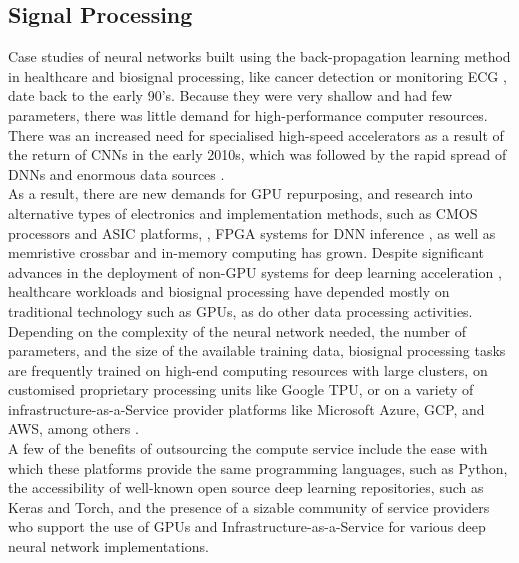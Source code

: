 \subsection[Signal Processing]{Signal Processing}

Case studies of neural networks built using the back-propagation learning method in healthcare and biosignal processing, like cancer detection \cite{ohno1998diagnosing} or monitoring ECG \cite{ku1992artificial}, date back to the early 90's. Because they were very shallow and had few parameters, there was little demand for high-performance computer resources. There was an increased need for specialised high-speed accelerators as a result of the return of CNNs in the early 2010s, which was followed by the rapid spread of DNNs and enormous data sources \cite{ambrogio2018equivalent}. \\

\noindent As a result, there are new demands for GPU repurposing, and research into alternative types of electronics and implementation methods, such as CMOS processors and ASIC platforms, \cite{lammie2019variation}, FPGA systems for DNN inference \cite{lammie2020training, lammie2019low}, as well as memristive crossbar and in-memory computing \cite{yao2020fully} has grown. Despite significant advances in the deployment of non-GPU systems for deep learning acceleration \cite{lammie2019stochastic}, healthcare workloads and biosignal processing have depended mostly on traditional technology such as GPUs, as do other data processing activities. \\

\noindent Depending on the complexity of the neural network needed, the number of parameters, and the size of the available training data, biosignal processing tasks are frequently trained on high-end computing resources with large clusters, on customised proprietary processing units like Google TPU, or on a variety of infrastructure-as-a-Service provider platforms like Microsoft Azure, GCP, and AWS, among others \cite{mckinney2020international}.\\

\noindent A few of the benefits of outsourcing the compute service include the ease with which these platforms provide the same programming languages, such as Python, the accessibility of well-known open source deep learning repositories, such as Keras and Torch, and the presence of a sizable community of service providers who support the use of GPUs and Infrastructure-as-a-Service for various deep neural network implementations. \\

